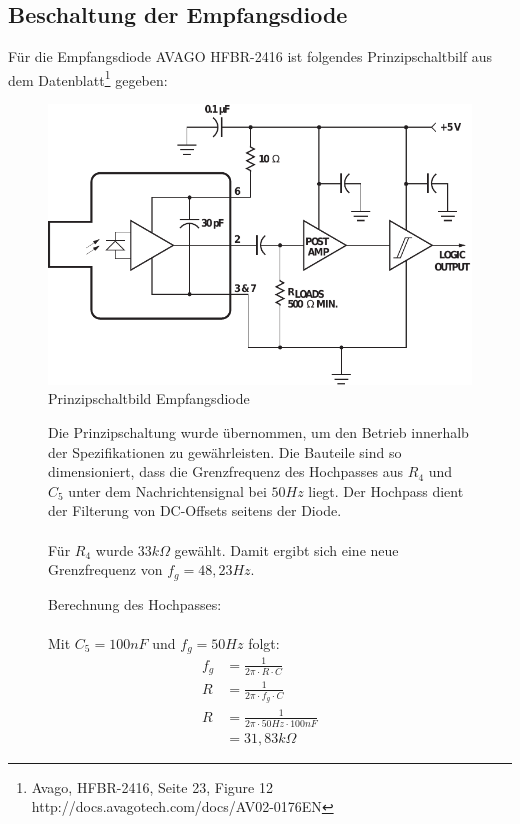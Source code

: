 \subsection{Beschaltung der Empfangsdiode}
\label{subsec:receiver_schematic}
Für die Empfangsdiode \textsc{AVAGO HFBR-2416} ist folgendes Prinzipschaltbilf aus dem Datenblatt\footnote{Avago, HFBR-2416, Seite 23, Figure 12 http://docs.avagotech.com/docs/AV02-0176EN} gegeben:
\begin{figure}[H]
	\centering
	\includegraphics[scale=0.65]{gfx/hfbr.pdf}
	\caption{Prinzipschaltbild Empfangsdiode}
	\label{fig:basic_schematic} 
\end{figure}
\begin{figure}[H]
	\begin{minipage}{0.45\textwidth} 
		Die Prinzipschaltung wurde übernommen, um den Betrieb innerhalb der Spezifikationen zu gewährleisten. Die Bauteile sind so dimensioniert, dass die Grenzfrequenz des Hochpasses aus $R_4$ und $C_5$ unter dem Nachrichtensignal bei $50Hz$ liegt. Der Hochpass dient der Filterung von DC-Offsets seitens der Diode. \\ \\
	Für $R_4$ wurde $33k\Omega$ gewählt. Damit ergibt sich eine neue Grenzfrequenz von $ f_{g}=48,23Hz $.
	\end{minipage}
	\hfill
	\begin{minipage}{0.45\textwidth}
	Berechnung des Hochpasses: \\ \\
	Mit $C_5 = 100nF$ und $f_g=50Hz$  folgt:
	\savebox\strutbox{$\vphantom{\dfrac11}$}
	\begin{align}
	  f_g &= \frac{1}{2 \pi \cdot R \cdot C}\\
		R &= \frac{1}{2 \pi \cdot f_g \cdot C}\\
		R &= \frac{1}{2 \pi \cdot 50 Hz \cdot 100nF}\\
		  &= 31,83k\Omega		 	
	\end{align}  
	\end{minipage}
\end{figure}

